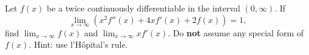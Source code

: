 Let $f(x)$ be a twice continuously differentiable in the interval $(0, \infty)$. If
$$ \lim_{x \to \infty} (x^2 f''(x) + 4x f'(x) + 2 f(x)) = 1, $$
find $\displaystyle{\lim_{x \to \infty} f(x)}$ and $\displaystyle{\lim_{x \to \infty} x f'(x)}$.
Do \textbf{not} assume any special form of $f(x)$. Hint: use l'Hôpital's rule.

